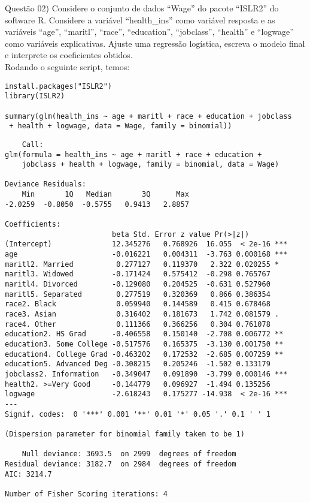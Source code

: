 
\noindent \textcolor{COLOR1}{Questão 02)} Considere o conjunto de dados ``Wage'' do pacote ``ISLR2'' do software R. Considere a variável ``health\_ins'' como variável resposta e as variáveis ``age'', ``maritl'', ``race'', ``education'', ``jobclass'', ``health'' e ``logwage'' como variáveis explicativas. Ajuste uma regressão logística, escreva o modelo final e interprete os coeficientes obtidos.
\\

Rodando o seguinte script, temos:
\\

\begin{lstlisting}
install.packages("ISLR2")
library(ISLR2)

summary(glm(health_ins ~ age + maritl + race + education + jobclass
 + health + logwage, data = Wage, family = binomial))
\end{lstlisting}

\begin{lstlisting}
    Call:
glm(formula = health_ins ~ age + maritl + race + education + 
    jobclass + health + logwage, family = binomial, data = Wage)

Deviance Residuals: 
    Min       1Q   Median       3Q      Max  
-2.0259  -0.8050  -0.5755   0.9413   2.8857  

Coefficients:
                         beta Std. Error z value Pr(>|z|)    
(Intercept)              12.345276   0.768926  16.055  < 2e-16 ***
age                      -0.016221   0.004311  -3.763 0.000168 ***
maritl2. Married          0.277127   0.119370   2.322 0.020255 *  
maritl3. Widowed         -0.171424   0.575412  -0.298 0.765767    
maritl4. Divorced        -0.129080   0.204525  -0.631 0.527960    
maritl5. Separated        0.277519   0.320369   0.866 0.386354    
race2. Black              0.059940   0.144589   0.415 0.678468    
race3. Asian              0.316402   0.181673   1.742 0.081579 .  
race4. Other              0.111366   0.366256   0.304 0.761078    
education2. HS Grad      -0.406558   0.150140  -2.708 0.006772 ** 
education3. Some College -0.517576   0.165375  -3.130 0.001750 ** 
education4. College Grad -0.463202   0.172532  -2.685 0.007259 ** 
education5. Advanced Deg -0.308215   0.205246  -1.502 0.133179    
jobclass2. Information   -0.349047   0.091890  -3.799 0.000146 ***
health2. >=Very Good     -0.144779   0.096927  -1.494 0.135256    
logwage                  -2.618243   0.175277 -14.938  < 2e-16 ***
---
Signif. codes:  0 '***' 0.001 '**' 0.01 '*' 0.05 '.' 0.1 ' ' 1

(Dispersion parameter for binomial family taken to be 1)

    Null deviance: 3693.5  on 2999  degrees of freedom
Residual deviance: 3182.7  on 2984  degrees of freedom
AIC: 3214.7

Number of Fisher Scoring iterations: 4
\end{lstlisting}

